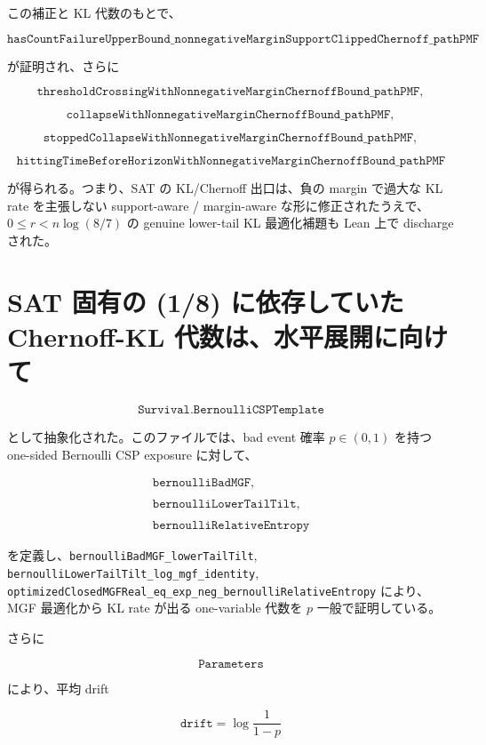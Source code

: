 \documentclass[12pt,a4paper]{article}
\begin{document}
この補正と KL 代数のもとで、

\[
\texttt{hasCountFailureUpperBound\_nonnegativeMarginSupportClippedChernoff\_pathPMF}
\]

が証明され、さらに

\[
\texttt{thresholdCrossingWithNonnegativeMarginChernoffBound\_pathPMF},
\]

\[
\texttt{collapseWithNonnegativeMarginChernoffBound\_pathPMF},
\]

\[
\texttt{stoppedCollapseWithNonnegativeMarginChernoffBound\_pathPMF},
\]

\[
\texttt{hittingTimeBeforeHorizonWithNonnegativeMarginChernoffBound\_pathPMF}
\]

が得られる。つまり、SAT の KL/Chernoff 出口は、負の margin で過大な KL rate を主張しない support-aware / margin-aware な形に修正されたうえで、\(0\le r<n\log(8/7)\) の genuine lower-tail KL 最適化補題も Lean 上で discharge された。

\section{SAT 固有の (1/8) に依存していた Chernoff-KL 代数は、水平展開に向けて}\label{sat-ux56faux6709ux306e-18-ux306bux4f9dux5b58ux3057ux3066ux3044ux305f-chernoff-kl-ux4ee3ux6570ux306fux6c34ux5e73ux5c55ux958bux306bux5411ux3051ux3066}

\[
\texttt{Survival.BernoulliCSPTemplate}
\]

として抽象化された。このファイルでは、bad event 確率 \(p\in(0,1)\) を持つ one-sided Bernoulli CSP exposure に対して、

\[
\begin{aligned}
\texttt{bernoulliBadMGF}, \\
\qquad \\
\texttt{bernoulliLowerTailTilt}, \\
\qquad \\
\texttt{bernoulliRelativeEntropy}
\end{aligned}
\]

を定義し、\texttt{bernoulliBadMGF\_lowerTailTilt}, \texttt{bernoulliLowerTailTilt\_log\_mgf\_identity}, \texttt{optimizedClosedMGFReal\_eq\_exp\_neg\_bernoulliRelativeEntropy} により、 MGF 最適化から KL rate が出る one-variable 代数を \(p\) 一般で証明している。

さらに

\[
\texttt{Parameters}
\]

により、平均 drift

\[
\texttt{drift}=\log\frac{1}{1-p}
\]
\end{document}
